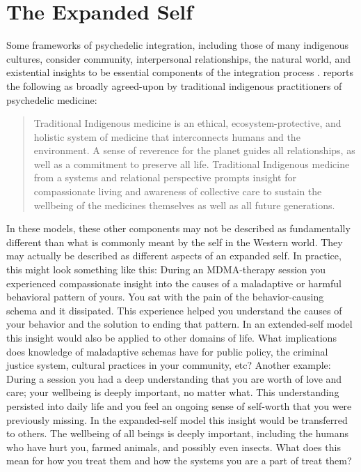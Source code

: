 \documentclass[12pt,letterpaper]{article}
\begin{document}
\section{The Expanded Self}
Some frameworks of psychedelic integration, including those of many indigenous cultures, consider community, interpersonal relationships, the natural world, and existential insights to be essential components of the integration process \cite{bathje2022Integration}. \textcite{celidwen2023Indigenous} reports the following as broadly agreed-upon by traditional indigenous practitioners of psychedelic medicine:
\begin{quotation}
    Traditional Indigenous medicine is an ethical, ecosystem-protective, and holistic system of medicine that interconnects humans and the environment. A sense of reverence for the planet guides all relationships, as well as a commitment to preserve all life. Traditional Indigenous medicine from a systems and relational perspective prompts insight for compassionate living and awareness of collective care to sustain the wellbeing of the medicines themselves as well as all future generations.
\end{quotation}
In these models, these other components may not be described as fundamentally different than what is commonly meant by the self in the Western world. They may actually be described as different aspects of an expanded self. In practice, this might look something like this: During an MDMA-therapy session you experienced compassionate insight into the causes of a maladaptive or harmful behavioral pattern of yours. You sat with the pain of the behavior-causing schema and it dissipated. This experience helped you understand the causes of your behavior and the solution to ending that pattern. In an extended-self model this insight would also be applied to other domains of life. What implications does knowledge of maladaptive schemas have for public policy, the criminal justice system, cultural practices in your community, etc? Another example: During a session you had a deep understanding that you are worth of love and care; your wellbeing is deeply important, no matter what. This understanding persisted into daily life and you feel an ongoing sense of self-worth that you were previously missing. In the expanded-self model this insight would be transferred to others. The wellbeing of all beings is deeply important, including the humans who have hurt you, farmed animals, and possibly even insects. What does this mean for how you treat them and how the systems you are a part of treat them?
\end{document}
